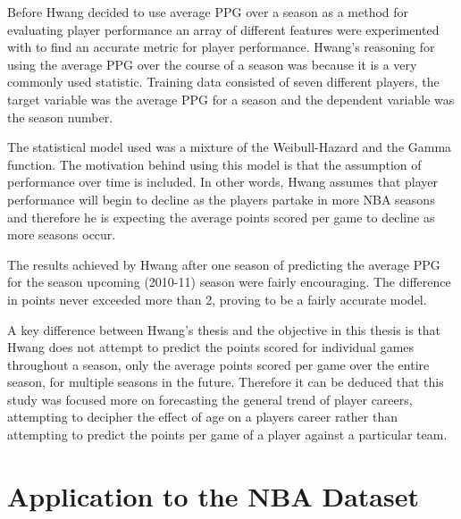 \documentclass[a4paper,11pt,twoside]{article}
\begin{document}
Before Hwang decided to use average PPG over a season as a method for evaluating player performance an array of different features were experimented with to find an accurate metric for player performance. Hwang's reasoning for using the average PPG over the course of a season was because it is a very commonly used statistic. Training data consisted of seven different players, the target variable was the average PPG for a season and the dependent variable was the season number. 

The statistical model used was a mixture of the Weibull-Hazard and the Gamma function. The motivation behind using this model is that the assumption of performance over time is included. In other words, Hwang assumes that player performance will begin to decline as the players partake in more NBA seasons and therefore he is expecting the average points scored per game to decline as more seasons occur.

The results achieved by Hwang after one season of predicting the average PPG for the season upcoming (2010-11) season were fairly encouraging. The difference in points never exceeded more than 2, proving to be a fairly accurate model.

A key difference between Hwang's thesis and the objective in this thesis is that Hwang does not attempt to predict the points scored for individual games throughout a season, only the average points scored per game over the entire season, for multiple seasons in the future. Therefore it can be deduced that this study was focused more on forecasting the general trend of player careers, attempting to decipher the effect of age on a players career rather than attempting to predict the points per game of a player against a particular team.

\newpage

\section{Application to the NBA Dataset}
\vspace{6mm}
\end{document}
